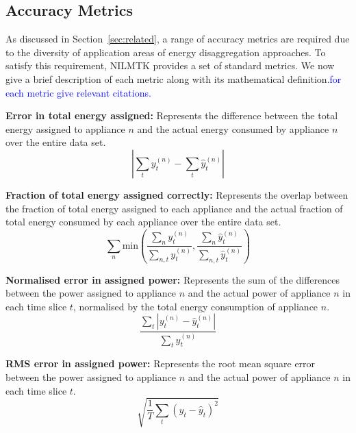 \documentclass{sig-alternate}
\newcommand{\bluecolor}[1]{\textcolor{blue}{#1}}
\newcommand{\secref}[1]{Section~\ref{#1}}
\begin{document}
\subsection{Accuracy Metrics}

\noindent
As discussed in \secref{sec:related}, a range of accuracy metrics are required due to the diversity of application areas of energy disaggregation approaches. To satisfy this requirement, NILMTK provides a set of standard metrics. 
We now give a brief description of each metric along with its mathematical definition.\bluecolor{for each metric give relevant citations.}

\textbf{Error in total energy assigned:} Represents the difference between the total energy assigned to appliance $n$ and the actual energy consumed by appliance $n$ over the entire data set.
\begin{equation}
        \left | \sum_t y^{(n)}_t - \sum_t \hat{y}^{(n)}_t \right |
\end{equation}

\textbf{Fraction of total energy assigned correctly:} Represents the overlap between the fraction of total energy assigned to each appliance and the actual fraction of total energy consumed by each appliance over the entire data set.
\begin{equation}
        \sum_n \mathrm{min} \left ( 
        \frac{\sum_n y^{(n)}_t}{\sum_{n,t} y^{(n)}_t}, 
        \frac{\sum_n \hat{y}^{(n)}_t}{\sum_{n,t} \hat{y}^{(n)}_t} 
        \right )
\end{equation}

\textbf{Normalised error in assigned power:} Represents the sum of the differences between the power assigned to appliance $n$ and the actual power of appliance $n$ in each time slice $t$, normalised by the total energy consumption of appliance $n$.
\begin{equation}
        \frac
        { \sum_t {\left | y_t^{(n)} - \hat{y}_t^{(n)} \right |} }
        { \sum_t y_t^{(n)} }
\end{equation}

\textbf{RMS error in assigned power:} Represents the root mean square error between the power assigned to appliance $n$ and the actual power of appliance $n$ in each time slice $t$.
\begin{equation}
\sqrt{ \frac{1}{T} \sum_t{ \left ( y_t - \hat{y}_t \right )^2 } }
\end{equation}
\end{document}
